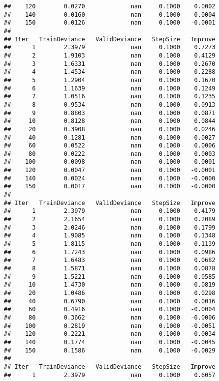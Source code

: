 \documentclass[]{article}
\begin{document}
\begin{verbatim}
##    120        0.0270             nan     0.1000    0.0002
##    140        0.0160             nan     0.1000   -0.0004
##    150        0.0126             nan     0.1000   -0.0001
## 
## Iter   TrainDeviance   ValidDeviance   StepSize   Improve
##      1        2.3979             nan     0.1000    0.7273
##      2        1.9103             nan     0.1000    0.4129
##      3        1.6331             nan     0.1000    0.2670
##      4        1.4534             nan     0.1000    0.2288
##      5        1.2904             nan     0.1000    0.1670
##      6        1.1639             nan     0.1000    0.1249
##      7        1.0516             nan     0.1000    0.1235
##      8        0.9534             nan     0.1000    0.0913
##      9        0.8803             nan     0.1000    0.0871
##     10        0.8128             nan     0.1000    0.0844
##     20        0.3908             nan     0.1000    0.0246
##     40        0.1281             nan     0.1000    0.0027
##     60        0.0522             nan     0.1000    0.0006
##     80        0.0222             nan     0.1000    0.0003
##    100        0.0098             nan     0.1000   -0.0001
##    120        0.0047             nan     0.1000   -0.0001
##    140        0.0024             nan     0.1000   -0.0000
##    150        0.0017             nan     0.1000   -0.0000
## 
## Iter   TrainDeviance   ValidDeviance   StepSize   Improve
##      1        2.3979             nan     0.1000    0.4179
##      2        2.1654             nan     0.1000    0.2089
##      3        2.0246             nan     0.1000    0.1799
##      4        1.9085             nan     0.1000    0.1348
##      5        1.8115             nan     0.1000    0.1139
##      6        1.7243             nan     0.1000    0.0986
##      7        1.6483             nan     0.1000    0.0682
##      8        1.5871             nan     0.1000    0.0878
##      9        1.5221             nan     0.1000    0.0585
##     10        1.4730             nan     0.1000    0.0819
##     20        1.0486             nan     0.1000    0.0298
##     40        0.6790             nan     0.1000    0.0016
##     60        0.4916             nan     0.1000   -0.0004
##     80        0.3662             nan     0.1000   -0.0006
##    100        0.2819             nan     0.1000   -0.0051
##    120        0.2221             nan     0.1000   -0.0034
##    140        0.1774             nan     0.1000   -0.0045
##    150        0.1586             nan     0.1000   -0.0029
## 
## Iter   TrainDeviance   ValidDeviance   StepSize   Improve
##      1        2.3979             nan     0.1000    0.6057

\end{verbatim}
\end{document}
